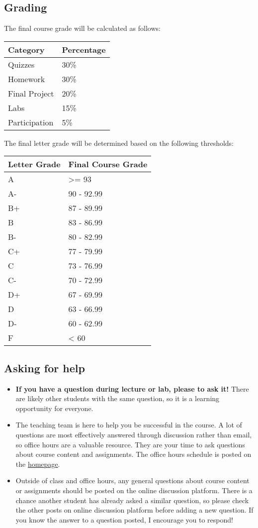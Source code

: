 \documentclass[
]{article}
\providecommand{\tightlist}{%
  \setlength{\itemsep}{0pt}\setlength{\parskip}{0pt}}
\begin{document}
\hypertarget{grading}{%
\subsection{Grading}\label{grading}}

The final course grade will be calculated as follows:

\begin{longtable}[]{@{}ll@{}}
\toprule
{} Category & {} Percentage\tabularnewline
\midrule
\endhead
Quizzes & 30\%\tabularnewline
Homework & 30\%\tabularnewline
Final Project & 20\%\tabularnewline
Labs & 15\%\tabularnewline
Participation & 5\%\tabularnewline
\bottomrule
\end{longtable}

The final letter grade will be determined based on the following
thresholds:

\begin{longtable}[]{@{}ll@{}}
\toprule
{} Letter Grade & {} Final Course Grade\tabularnewline
\midrule
\endhead
A & \textgreater= 93\tabularnewline
A- & 90 - 92.99\tabularnewline
B+ & 87 - 89.99\tabularnewline
B & 83 - 86.99\tabularnewline
B- & 80 - 82.99\tabularnewline
C+ & 77 - 79.99\tabularnewline
C & 73 - 76.99\tabularnewline
C- & 70 - 72.99\tabularnewline
D+ & 67 - 69.99\tabularnewline
D & 63 - 66.99\tabularnewline
D- & 60 - 62.99\tabularnewline
F & \textless{} 60\tabularnewline
\bottomrule
\end{longtable}

\hypertarget{asking-for-help}{%
\subsection{Asking for help}\label{asking-for-help}}

\begin{itemize}
\tightlist
\item
  \textbf{If you have a question during lecture or lab, please to ask
  it!} There are likely other students with the same question, so it is
  a learning opportunity for everyone.
\item
  The teaching team is here to help you be successful in the course. A
  lot of questions are most effectively answered through discussion
  rather than email, so office hours are a valuable resource. They are
  your time to ask questions about course content and assignments. The
  office hours schedule is posted on the \href{/home/}{homepage}.
\item
  Outside of class and office hours, any general questions about course
  content or assignments should be posted on the online discussion
  platform. There is a chance another student has already asked a
  similar question, so please check the other posts on online discussion
  platform before adding a new question. If you know the answer to a
  question posted, I encourage you to respond!
\end{itemize}
\end{document}

